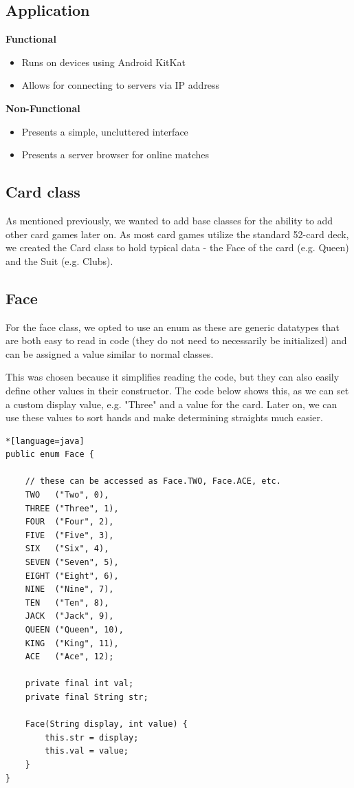 \documentclass[11pt]{article}
\begin{document}
\subsection{Application}

\textbf{Functional}
\begin{itemize}
	\item Runs on devices using Android KitKat
	\item Allows for connecting to servers via IP address
\end{itemize}
\textbf{Non-Functional}

\begin{itemize}
	\item Presents a simple, uncluttered interface
	\item Presents a server browser for online matches
\end{itemize}

\newpage


\subsection{Card class}
As mentioned previously, we wanted to add base classes for the ability to add other card games later on. As most card games utilize the standard 52-card deck, we created the Card class to hold typical data - the Face of the card (e.g. Queen) and the Suit (e.g. Clubs). \\


\subsection{Face}
For the face class, we opted to use an enum as these are generic datatypes that are both easy to read in code (they do not need to necessarily be initialized) and can be assigned a value similar to normal classes. 

This was chosen because it simplifies reading the code, but they can also easily define other values in their constructor. The code below shows this, as we can set a custom display value, e.g. "Three" and a value for the card. Later on, we can use these values to sort hands and make determining straights much easier.

\begin{lstlisting}*[language=java]
public enum Face {

	// these can be accessed as Face.TWO, Face.ACE, etc. 
    TWO   ("Two", 0),
    THREE ("Three", 1),
    FOUR  ("Four", 2),
    FIVE  ("Five", 3),
    SIX   ("Six", 4),
    SEVEN ("Seven", 5),
    EIGHT ("Eight", 6),
    NINE  ("Nine", 7),
    TEN   ("Ten", 8),
    JACK  ("Jack", 9),
    QUEEN ("Queen", 10),
    KING  ("King", 11),
    ACE   ("Ace", 12);

    private final int val;
    private final String str;

    Face(String display, int value) {
        this.str = display;
        this.val = value;
    }
}
\end{lstlisting}
\end{document}

